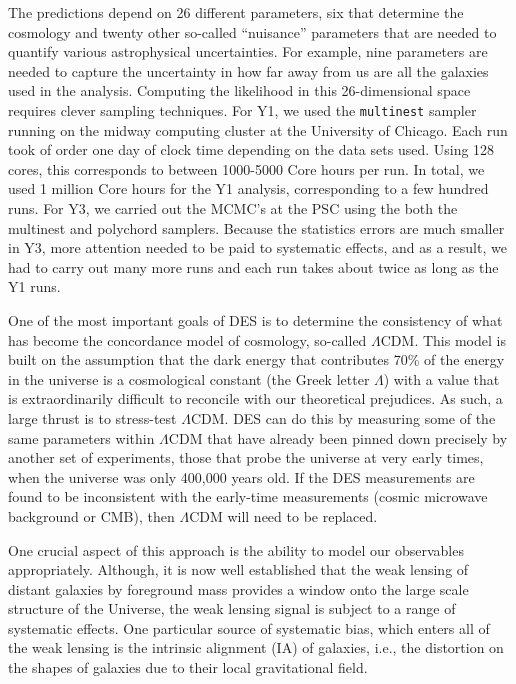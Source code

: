 \documentclass[12pt]{article}
\begin{document}
\begin{small}
The predictions depend on 26 different parameters, six that determine the cosmology and twenty other so-called ``nuisance'' parameters that are needed to quantify various astrophysical uncertainties. For example, nine parameters are needed to capture the uncertainty in how far away from us are all the galaxies used in the analysis. Computing the likelihood in this 26-dimensional space requires clever sampling techniques. For Y1, we used the {\tt multinest} sampler~\cite{Feroz:2008xx} running on the midway computing cluster at the University of Chicago. Each run took of order one day of clock time depending on the data sets used. Using 128 cores, this corresponds to between 1000-5000 Core hours per run. In total, we used 1 million Core hours for the Y1 analysis, corresponding to a few hundred runs. For Y3, we carried out the MCMC's at the PSC using the both the multinest and polychord samplers. Because the statistics errors are much smaller in Y3, more attention needed to be paid to systematic effects, and as a result, we had to carry out many more runs and each run takes about twice as long as the Y1 runs.

One of the most important goals of DES is to determine the consistency of what has become the concordance model of cosmology, so-called $\Lambda$CDM. This model is built on the assumption that the dark energy that contributes 70\% of the energy in the universe is a cosmological constant (the Greek letter $\Lambda$) with a value that is extraordinarily difficult to reconcile with our theoretical prejudices. As such, a large thrust is to stress-test $\Lambda$CDM. DES can do this by measuring some of the same parameters within $\Lambda$CDM that have already been pinned down precisely by another set of experiments, those that probe the universe at very early times, when the universe was only 400,000 years old. If the DES measurements are found to be inconsistent with the early-time measurements (cosmic microwave background or CMB), then $\Lambda$CDM will need to be replaced.

One crucial aspect of this approach is the ability to model our observables appropriately. Although, it is now well established that the weak lensing of distant galaxies by foreground mass provides a window onto the large scale structure of the Universe, the weak lensing signal is subject to a range of systematic effects. One particular source of systematic bias, which enters all of the weak lensing is the intrinsic alignment (IA) of galaxies, i.e., the distortion on the shapes of galaxies due to their local gravitational field.


\end{small}
\end{document}
